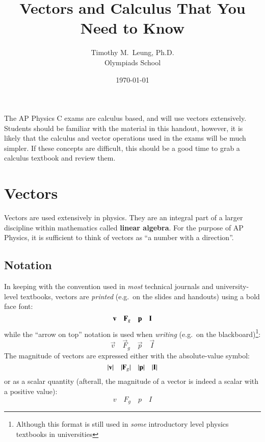 \documentclass[11pt]{article}
\title{Vectors and Calculus That You Need to Know}
\author{Timothy M.\ Leung, Ph.D.\\Olympiads School}
\date{\today}
\newcommand{\mb}[1]{\ensuremath\mathbf{#1}}
\begin{document}
\maketitle

The AP Physics C exams are calculus based, and will use vectors extensively.
Students should be familiar with the material in this handout, however, it is
likely that the calculus and vector operations used in the exams will be much
simpler. If these concepts are difficult, this should be a good time to grab a
calculus textbook and review them.

\section{Vectors}
Vectors are used extensively in physics. They are an integral part of a larger
discipline within mathematics called \textbf{linear algebra}. For the purpose
of AP Physics, it is sufficient to think of vectors as
``a number with a direction''.

\subsection{Notation}
In keeping with the convention used in \emph{most} technical journals and
university-level textbooks, vectors are \emph{printed} (e.g.\ on the slides and
handouts) using a bold face font:
\begin{equation*}
  \mb{v}\quad\mb{F}_g\quad\mb{p}\quad\mb{I}
\end{equation*}
while the ``arrow on top'' notation is used when \emph{writing} (e.g.\ on the
blackboard)\footnote{Although this format is still used in \emph{some}
  introductory level physics textbooks in universities}:
\begin{equation*}
  \vec{v}\quad\vec{F}_g\quad\vec{p}\quad\vec{I}
\end{equation*}
The magnitude of vectors are expressed either with the absolute-value symbol:
\begin{equation*}
  |\mb{v}|\quad|\mb{F}_g|\quad|\mb{p}|\quad|\mb{I}|
\end{equation*}
or as a scalar quantity (afterall, the magnitude of a vector is indeed a scalar
with a positive value):
\begin{equation*}
  v\quad F_g\quad p \quad I
\end{equation*}
\end{document}

